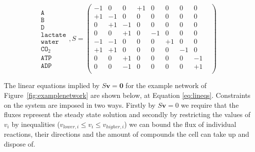 \documentclass[a4paper,12pt]{article}
\begin{document}
	\begin{equation}
	\begin{matrix}
		\texttt{A}  \\
		\texttt{B}\\
		\texttt{D}\\
		\texttt{lactate}\\
		\texttt{water}\\
		\texttt{CO}_2\\
		\texttt{ATP}\\
		\texttt{ADP}
	\end{matrix}
	,S=
	\begin{pmatrix}
			 -1 & 0 & 0 & +1 & 0 & 0 & 0 & 0 & \\ 
			 +1 & -1 & 0 & 0 & 0 & 0 & 0 &0 & \\ 
			 0 & +1 & -1 & 0 & 0 & 0 & 0 & 0 & \\ 
			 0 & 0 & +1 & 0 & -1 & 0 & 0 & 0 & \\ 
			 -1 & -1 & 0 & 0 & 0 &+1 & 0 & 0 & \\ 
			 +1 & +1 & 0 & 0 & 0 & 0 & -1&0 & \\ 
			 0 & 0 & +1 & 0 & 0 & 0 &0 & -1 &\\ 
			 0 & 0 & -1 & 0 & 0 & 0 &0 & +1 & \\ 
			 
		\end{pmatrix} 
		\label{eq:examplematrix}
	\end{equation}


	The linear equations implied by $S\mathbf{v}=\mathbf{0}$ for the example network of Figure~\ref{fig:examplenetwork} are shown below, at Equation \ref{eq:lineqs}. Constraints on the system are imposed in two ways. Firstly by $S\mathbf{v}=0$ we require that the fluxes represent the steady state solution and secondly by restricting the values of $v_i$ by inequalities ($v_{lower,i}\leq v_i \leq v_{higher,i}$) we can bound the flux of individual reactions, their directions and the amount of compounds the cell can take up and dispose of. 
	
\end{document}
